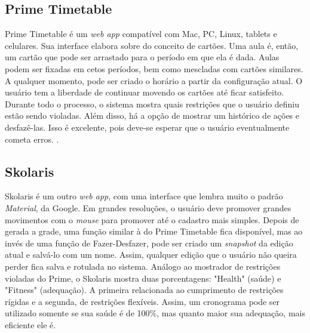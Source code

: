 \documentclass[12pt,a4paper]{article}
\begin{document}
		\subsection{Prime Timetable}

			\par Prime Timetable é um \textit{web app} compatível com Mac, PC, Linux, tablets e celulares. Sua interface elabora sobre do conceito de cartões. Uma aula é, então, um cartão que pode ser arrastado para o período em que ela é dada. Aulas podem ser fixadas em cetos períodos, bem como mescladas com cartões similares. A qualquer momento, pode ser criado o horário a partir da configuração atual. O usuário tem a liberdade de continuar movendo os cartões até ficar satisfeito. Durante todo o processo, o sistema mostra quais restrições que o usuário definiu estão sendo violadas. Além disso, há a opção de mostrar um histórico de ações e desfazê-las. Isso é excelente, pois deve-se esperar que o usuário eventualmente cometa erros. \cite{norman, gnome_hig}.

		\subsection{Skolaris}

			\par Skolaris é um outro \textit{web app}, com uma interface que lembra muito o padrão \textit{Material}, da Google. Em grandes resoluções, o usuário deve promover grandes movimentos com o \textit{mouse} para promover até o cadastro mais simples. Depois de gerada a grade, uma função similar à do Prime Timetable fica disponível, mas ao invés de uma função de Fazer-Desfazer, pode ser criado um \textit{snapshot} da edição atual e salvá-lo com um nome. Assim, qualquer edição que o usuário não queira perder fica salva e rotulada no sistema. Análogo ao mostrador de restrições violadas do Prime, o Skolaris mostra duas porcentagens: "Health" (saúde) e "Fitness" (adequação). A primeira relacionada ao cumprimento de restrições rígidas e a segunda, de restrições flexíveis. Assim, um cronograma pode ser utilizado somente se sua saúde é de 100\%, mas quanto maior sua adequação, mais eficiente ele é.


\end{document}
